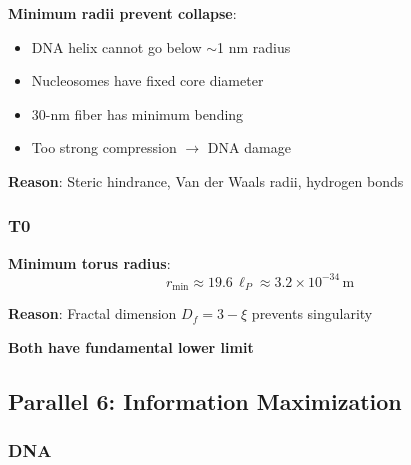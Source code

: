 	\textbf{Minimum radii prevent collapse}:

	\begin{itemize}
		\item DNA helix cannot go below $\sim$1 nm radius
		\item Nucleosomes have fixed core diameter
		\item 30-nm fiber has minimum bending
		\item Too strong compression $\to$ DNA damage
	\end{itemize}

	\textbf{Reason}: Steric hindrance, Van der Waals radii, hydrogen bonds

	\subsubsection{T0}

	\textbf{Minimum torus radius}:
	\begin{equation}
		r_{\min} \approx 19.6\,\ell_P \approx 3.2 \times 10^{-34}\,\text{m}
	\end{equation}

	\textbf{Reason}: Fractal dimension $D_f = 3-\xi$ prevents singularity

	\begin{keyresult}
		\textbf{Both have fundamental lower limit}

		\begin{table}[H]
			\centering
		\end{table}
	\end{keyresult}

	\subsection{Parallel 6: Information Maximization}

	\subsubsection{DNA}

